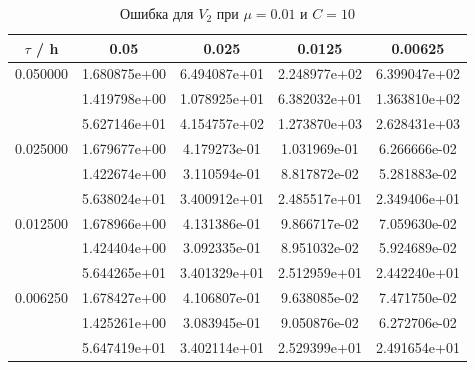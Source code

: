 \documentclass[specialist,subf,href,colorlinks=true,12pt
,times,mtpro,specialist
]{disser}
\begin{document}
\begin{table}[H]
\small
\caption{Ошибка для $V_2$ при $\mu=0.01$ и $C = 10$}
\begin{center}
\begin{tabular}{|c|c|c|c|c|}
\hline
$\tau$ / h & 0.05 & 0.025 & 0.0125 & 0.00625 \\
\hline
0.050000 & 1.680875e+00  & 6.494087e+01  & 2.248977e+02  & 6.399047e+02 \\
 & 1.419798e+00  & 1.078925e+01  & 6.382032e+01  & 1.363810e+02 \\
 & 5.627146e+01  & 4.154757e+02  & 1.273870e+03  & 2.628431e+03 \\
\hline
0.025000 & 1.679677e+00  & 4.179273e-01  & 1.031969e-01  & 6.266666e-02 \\
 & 1.422674e+00  & 3.110594e-01  & 8.817872e-02  & 5.281883e-02 \\
 & 5.638024e+01  & 3.400912e+01  & 2.485517e+01  & 2.349406e+01 \\
\hline
0.012500 & 1.678966e+00  & 4.131386e-01  & 9.866717e-02  & 7.059630e-02 \\
 & 1.424404e+00  & 3.092335e-01  & 8.951032e-02  & 5.924689e-02 \\
 & 5.644265e+01  & 3.401329e+01  & 2.512959e+01  & 2.442240e+01 \\
\hline
0.006250 & 1.678427e+00  & 4.106807e-01  & 9.638085e-02  & 7.471750e-02 \\
 & 1.425261e+00  & 3.083945e-01  & 9.050876e-02  & 6.272706e-02 \\
 & 5.647419e+01  & 3.402114e+01  & 2.529399e+01  & 2.491654e+01 \\
\hline
\end{tabular}
\end{center}
\end{table}
\end{document}
